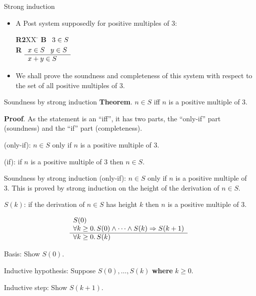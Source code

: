 \begin{wideslide}[bm=,toc=]{Strong induction}
\begin{itemize}
\item A Post system supposedly for positive multiples of 3:
\vspace{-1em}
\begin{tabbing}
{\bf R2}XX \=  \kill
{\bf B} \>
        \(\begin{array}[t]{l}
        3\in S
        \end{array}\) \\[2ex]
{\bf R} \>
        \(\begin{array}[t]{l}
        x \in S \;\;\;y \in S \\
        \hline
        x + y \in S
        \end{array}\)
\end{tabbing}
\item We shall prove the soundness and completeness of this system with respect to
the set of all positive multiples of 3.
\end{itemize}
\end{wideslide}

\begin{wideslide}[bm=,toc=]{Soundness by strong induction}
{\bf Theorem}. $n\in S$ iff $n$ is a positive multiple of 3.
\vspace{1em}

{\bf Proof}.  As the statement is an ``iff'', it has two parts, the ``only-if'' part (soundness)
and the ``if'' part (completeness).

\vspace{1em} 
(only-if): $n\in S$ only if $n$ is a positive multiple of 3.

\vspace{1em} 
(if): if $n$ is a positive multiple of 3 then $n\in S$. 
\end{wideslide}


\begin{wideslide}[bm=,toc=]{Soundness by strong induction}
(only-if): $n\in S$ only if $n$ is a positive multiple of 3.
This is proved by strong induction on the height of the derivation of $n\in S$.

\vspace{1em}
$S(k)$: if the derivation of $n\in S$ has height $k$ then $n$ is a positive multiple of 3.

\begin{displaymath}
\begin{array}[t]{l}
S(0) \\
\forall k\geq 0.\, S(0)\wedge \cdots \wedge S(k)\Rightarrow S(k+1) \\
\hline
\forall k\geq 0.\, S(k)
\end{array}
\end{displaymath}

\vspace{1em}
Basis: Show $S(0)$.

\vspace{1em}
Inductive hypothesis: Suppose $S(0),\ldots ,S(k)$ {\bf where} $k\geq 0$.

\vspace{1em}
Inductive step: Show $S(k+1)$.
\end{wideslide}

